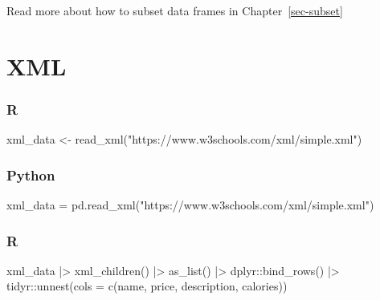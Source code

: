 \documentclass[
  letterpaper,
  DIV=11,
  numbers=noendperiod]{scrreprt}
\newenvironment{Shaded}{\begin{snugshade}}{\end{snugshade}}
\newcommand{\AttributeTok}[1]{\textcolor[rgb]{0.40,0.46,0.14}{#1}}
\newcommand{\FunctionTok}[1]{\textcolor[rgb]{0.28,0.35,0.67}{#1}}
\newcommand{\NormalTok}[1]{\textcolor[rgb]{0.00,0.46,0.62}{#1}}
\newcommand{\OperatorTok}[1]{\textcolor[rgb]{0.37,0.37,0.37}{#1}}
\newcommand{\OtherTok}[1]{\textcolor[rgb]{0.00,0.46,0.62}{#1}}
\newcommand{\SpecialCharTok}[1]{\textcolor[rgb]{0.37,0.37,0.37}{#1}}
\newcommand{\StringTok}[1]{\textcolor[rgb]{0.13,0.47,0.30}{#1}}
\begin{document}
Read more about how to subset data frames in Chapter~\ref{sec-subset}

\hypertarget{xml}{%
\section{XML}\label{xml}}

\hypertarget{r-9}{%
\subsubsection{R}\label{r-9}}

\begin{Shaded}
\begin{Highlighting}[]
\NormalTok{xml\_data }\OtherTok{\textless{}{-}} \FunctionTok{read\_xml}\NormalTok{(}\StringTok{"https://www.w3schools.com/xml/simple.xml"}\NormalTok{)}
\end{Highlighting}
\end{Shaded}

\hypertarget{python-9}{%
\subsubsection{Python}\label{python-9}}

\begin{Shaded}
\begin{Highlighting}[]
\NormalTok{xml\_data }\OperatorTok{=}\NormalTok{ pd.read\_xml(}\StringTok{"https://www.w3schools.com/xml/simple.xml"}\NormalTok{)}
\end{Highlighting}
\end{Shaded}

\hypertarget{r-10}{%
\subsubsection{R}\label{r-10}}

\begin{Shaded}
\begin{Highlighting}[]
\NormalTok{xml\_data }\SpecialCharTok{|\textgreater{}} 
    \FunctionTok{xml\_children}\NormalTok{() }\SpecialCharTok{|\textgreater{}} 
    \FunctionTok{as\_list}\NormalTok{() }\SpecialCharTok{|\textgreater{}} 
\NormalTok{    dplyr}\SpecialCharTok{::}\FunctionTok{bind\_rows}\NormalTok{() }\SpecialCharTok{|\textgreater{}} 
\NormalTok{    tidyr}\SpecialCharTok{::}\FunctionTok{unnest}\NormalTok{(}\AttributeTok{cols =} \FunctionTok{c}\NormalTok{(name, price, description, calories))}
\end{Highlighting}
\end{Shaded}
\end{document}
